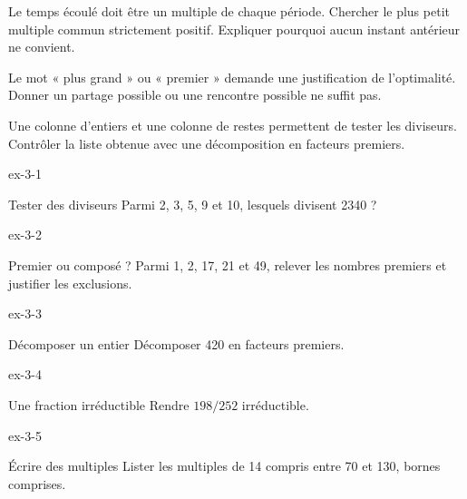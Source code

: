 \begin{savoirfaire}Le temps écoulé doit être un multiple de chaque période. Chercher le plus petit multiple commun strictement positif. Expliquer pourquoi aucun instant antérieur ne convient.\end{savoirfaire}
\begin{attention}Le mot « plus grand » ou « premier » demande une justification de l’optimalité. Donner un partage possible ou une rencontre possible ne suffit pas.\end{attention}
Une colonne d’entiers et une colonne de restes permettent de tester les diviseurs. Contrôler la liste obtenue avec une décomposition en facteurs premiers.
\clearpage{}
\begin{blocLivre}{ex-3-1}\begin{exercice}[1]{Tester des diviseurs}
Parmi 2, 3, 5, 9 et 10, lesquels divisent 2340 ?
\end{exercice}\end{blocLivre}
\begin{blocLivre}{ex-3-2}\begin{exercice}[1]{Premier ou composé ?}
Parmi 1, 2, 17, 21 et 49, relever les nombres premiers et justifier les exclusions.
\end{exercice}\end{blocLivre}
\begin{blocLivre}{ex-3-3}\begin{exercice}[1]{Décomposer un entier}
Décomposer 420 en facteurs premiers.
\end{exercice}\end{blocLivre}
\begin{blocLivre}{ex-3-4}\begin{exercice}[1]{Une fraction irréductible}
Rendre $198/252$ irréductible.
\end{exercice}\end{blocLivre}
\begin{blocLivre}{ex-3-5}\begin{exercice}[1]{Écrire des multiples}
Lister les multiples de 14 compris entre 70 et 130, bornes comprises.
\end{exercice}\end{blocLivre}

